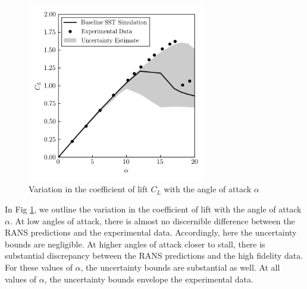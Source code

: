 \begin{figure}
\center
\includegraphics[width=0.7\textwidth]{suthesis/images/L6_ls_cl_vs_alpha_uq.png}
\caption{Variation in the coefficient of lift $C_L$ with the angle of attack $\alpha$\label{fig:naca0012_cl_vs_alpha}}
\end{figure}

In Fig \ref{fig:naca0012_cl_vs_alpha}, we outline the variation in the coefficient of lift with the angle of attack $\alpha$. At low angles of attack, there is almost no discernible difference between the RANS predictions and the experimental data. Accordingly, here the uncertainty bounds are negligible. At higher angles of attack closer to stall, there is substantial discrepancy between the RANS predictions and the high fidelity data. For these values of $\alpha$, the uncertainty bounds are substantial as well. At all values of $\alpha$, the uncertainty bounds envelope the experimental data. 

